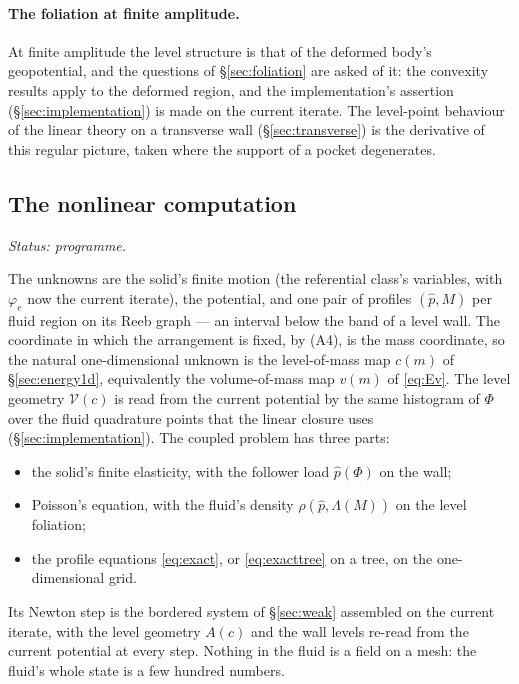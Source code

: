 \documentclass[11pt]{article}
\theoremstyle{definition}
\theoremstyle{remark}
\newcommand{\Vol}{\mathcal V}
\newcommand{\status}[1]{\noindent\emph{Status: #1}\par\smallskip}
\begin{document}
\paragraph{The foliation at finite amplitude.} At finite amplitude the
level structure is that of the deformed body's geopotential, and the
questions of \S\ref{sec:foliation} are asked of it: the convexity
results apply to the deformed region, and the implementation's
assertion (\S\ref{sec:implementation}) is made on the current iterate.
The level-point behaviour of the linear theory on a transverse wall
(\S\ref{sec:transverse}) is the derivative of this regular picture,
taken where the support of a pocket degenerates.

\subsection{The nonlinear computation}
\label{sec:NL-compute}

\status{programme.}

The unknowns are the solid's finite motion (the referential class's
variables, with $\varphi_e$ now the current iterate), the potential,
and one pair of profiles $(\hat p, M)$ per fluid region on its Reeb
graph --- an interval below the band of a level wall. The coordinate in
which the arrangement is fixed, by (A4), is the mass coordinate, so the
natural one-dimensional unknown is the level-of-mass map $c(m)$ of
\S\ref{sec:energy1d}, equivalently the volume-of-mass map $v(m)$ of
\eqref{eq:Ev}. The level geometry $\Vol(c)$ is read from the current
potential by the same histogram of $\Phi$ over the fluid quadrature
points that the linear closure uses (\S\ref{sec:implementation}). The
coupled problem has three parts:
\begin{itemize}
\item the solid's finite elasticity, with the follower load $\hat
  p(\Phi)$ on the wall;
\item Poisson's equation, with the fluid's density $\rho(\hat p,
  \Lambda(M))$ on the level foliation;
\item the profile equations \eqref{eq:exact}, or \eqref{eq:exacttree}
  on a tree, on the one-dimensional grid.
\end{itemize}
Its Newton step is the bordered system of \S\ref{sec:weak} assembled on
the current iterate, with the level geometry $A(c)$ and the wall
levels re-read from the current potential at every step. Nothing in
the fluid is a field on a mesh: the fluid's whole state is a few
hundred numbers.
\end{document}

